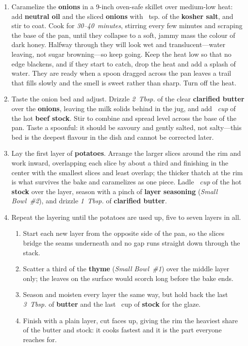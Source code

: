 \documentclass[11pt,letterpaper]{article}
\begin{document}
\begin{enumerate}
    \item Caramelize the \textbf{onions} in a 9-inch oven-safe skillet over medium-low heat: add \textbf{neutral oil} and the sliced \textbf{onions} with ~tsp. of the \textbf{kosher salt}, and stir to coat. Cook for \textit{30--40~minutes}, stirring every few minutes and scraping the base of the pan, until they collapse to a soft, jammy mass the colour of dark honey. Halfway through they will look wet and translucent---water leaving, not sugar browning---so keep going. Keep the heat low so that no edge blackens, and if they start to catch, drop the heat and add a splash of water. They are ready when a spoon dragged across the pan leaves a trail that fills slowly and the smell is sweet rather than sharp. Turn off the heat.

    \item Taste the onion bed and adjust. Drizzle \textit{2~Tbsp.} of the clear \textbf{clarified butter} over the \textbf{onions}, leaving the milk solids behind in the jug, and add \textit{~cup} of the hot \textbf{beef stock}. Stir to combine and spread level across the base of the pan. Taste a spoonful: it should be savoury and gently salted, not salty---this bed is the deepest flavour in the dish and cannot be corrected later.

    \item Lay the first layer of \textbf{potatoes}. Arrange the larger slices around the rim and work inward, overlapping each slice by about a third and finishing in the center with the smallest slices and least overlap; the thicker thatch at the rim is what survives the bake and caramelizes as one piece. Ladle \textit{~cup} of the hot \textbf{stock} over the layer, season with a pinch of \textbf{layer seasoning} (\textit{Small Bowl~\#2}), and drizzle \textit{1~Tbsp.} of \textbf{clarified butter}.

    \item Repeat the layering until the potatoes are used up, five to seven layers in all.
\begin{enumerate}
    \item Start each new layer from the opposite side of the pan, so the slices bridge the seams underneath and no gap runs straight down through the stack.
    \item Scatter a third of the \textbf{thyme} (\textit{Small Bowl~\#1}) over the middle layer only; the leaves on the surface would scorch long before the bake ends.
    \item Season and moisten every layer the same way, but hold back the last \textit{3~Tbsp.} of \textbf{butter} and the last ~cup of \textbf{stock} for the glaze.
    \item Finish with a plain layer, cut faces up, giving the rim the heaviest share of the butter and stock: it cooks fastest and it is the part everyone reaches for.
\end{enumerate}


\end{enumerate}
\end{document}
